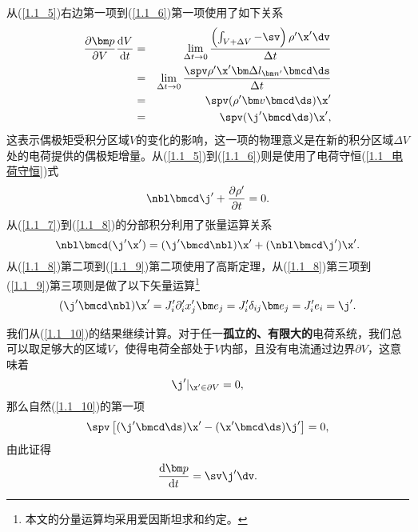 从(\ref{1.1_5})右边第一项到(\ref{1.1_6})第一项使用了如下关系
\begin{eqnarray}
    \frac{\partial \bm p}{\partial V} \frac{\mathrm d V}{\mathrm d t} 
    & = & 
        \lim_{\Delta t \to 0}  \frac{\left(\int_{V+\Delta V}-\sv\right)\rho'\x'\dv}{\Delta t} \\
    & = & 
        \lim_{\Delta t \to 0}  \frac{\spv\rho'\x'\bm \Delta l_{\bm n'}\bmcd\ds}{\Delta t}\\
    & = & 
        {\spv(\rho'\bm v\bmcd\ds)\x'}\\
    & = & 
        \spv(\j'\bmcd\ds)\x',
\end{eqnarray}
这表示偶极矩受积分区域$V$的变化的影响，这一项的物理意义是在新的积分区域$\Delta V$处的电荷提供的偶极矩增量。从(\ref{1.1_5})到(\ref{1.1_6})则是使用了电荷守恒(\ref{1.1_电荷守恒})式
\begin{equation}
    \nbl\bmcd\j' + \frac{\partial \rho'}{\partial t} = 0.
\end{equation}
从(\ref{1.1_7})到(\ref{1.1_8})的分部积分利用了张量运算关系
\begin{equation}
    \nbl\bmcd(\j'\x') = (\j'\bmcd\nbl)\x' + (\nbl\bmcd\j')\x'.
\end{equation}
从(\ref{1.1_8})第二项到(\ref{1.1_9})第二项使用了高斯定理，从(\ref{1.1_8})第三项到(\ref{1.1_9})第三项则是做了以下矢量运算\footnote{本文的分量运算均采用爱因斯坦求和约定。}
\begin{equation}
    (\j'\bmcd\nbl)\x' = J'_i\partial'_i x'_j \bm e_j = J'_i\delta_{ij}\bm e_j = J'_i e_i = \j'.
\end{equation}

我们从(\ref{1.1_10})的结果继续计算。对于任一\textbf{孤立的、有限大的}电荷系统，我们总可以取足够大的区域$V$，使得电荷全部处于$V$内部，且没有电流通过边界$\partial V$，这意味着
\begin{equation}
    \j'|_{\x'\in\partial V} = 0,
\end{equation}
那么自然(\ref{1.1_10})的第一项
\begin{equation}
    \spv\left[ (\j'\bmcd\ds)\x' - (\x'\bmcd\ds)\j' \right] = 0,
\end{equation}
由此证得
\begin{equation}
    \frac{\mathrm d \bm p}{\mathrm d t}  = \sv\j'\dv.
\end{equation}

